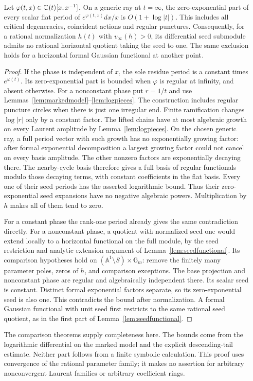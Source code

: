 \begin{theorem}\label{thm:laurentlog}
Let $\varphi(t,x)\in\mathbb C(t)[x,x^{-1}]$. On a generic ray at
$t=\infty$, the zero-exponential part of every scalar flat period
of $e^{\varphi(t,x)}dx/x$ is $O(1+\log|t|)$. This includes all
critical degeneracies, coincident actions and regular punctures.
Consequently, for a rational normalization $h(t)$ with
$v_\infty(h)>0$, its differential seed submodule admits no rational
horizontal quotient taking the seed to one. The same exclusion
holds for a horizontal formal Gaussian functional at another point.
\end{theorem}
\begin{proof}
If the phase is independent of $x$, the sole residue period is a
constant times $e^{\varphi(t)}$. Its zero-exponential part is bounded
when $\varphi$ is regular at infinity, and absent otherwise.
For a nonconstant phase put $r=1/t$ and use
Lemmas~\ref{lem:markedmodel}--\ref{lem:logpieces}. The construction
includes regular puncture circles when there is just one irregular end.
Finite ramification changes $\log|r|$ only by a constant factor.
The lifted chains have at most algebraic growth on every Laurent
amplitude by Lemma~\ref{lem:logpieces}. On the chosen generic ray,
a full period vector with such growth has no exponentially growing
factor: after formal exponential decomposition a largest growing
factor could not cancel on every basis amplitude. The other nonzero
factors are exponentially decaying there. The nearby-cycle basis
therefore gives a full basis of regular functionals modulo those
decaying terms, with constant coefficients in the flat basis. Every
one of their seed periods has the asserted logarithmic bound. Thus
their zero-exponential seed
expansions have no negative algebraic powers. Multiplication by $h$
makes all of them tend to zero.

For a constant phase the rank-one period already gives the same
contradiction directly. For a nonconstant phase, a quotient with
normalized seed one would extend locally to a
horizontal functional on the full module, by the seed restriction
and analytic extension argument of Lemma~\ref{lem:seedfunctional}.
Its comparison hypotheses hold on
$(\mathbb A^1\setminus S)\times\mathbb G_m$: remove the finitely
many parameter poles, zeros of $h$, and comparison exceptions.
The base projection and nonconstant phase are regular and
algebraically independent there.
Its scalar seed is constant. Distinct formal exponential factors
separate, so its zero-exponential seed is also one. This contradicts
the bound after normalization. A formal Gaussian functional with
unit seed first restricts to the same rational seed quotient, as in
the first part of Lemma~\ref{lem:seedfunctional}.
\end{proof}

The comparison theorems supply completeness here. The bounds come
from the logarithmic differential on the marked model and the explicit
descending-tail estimate. Neither part follows from a finite symbolic
calculation. This proof uses convergence of the rational parameter
family; it makes no assertion for arbitrary nonconvergent Laurent
families or arbitrary coefficient rings.
